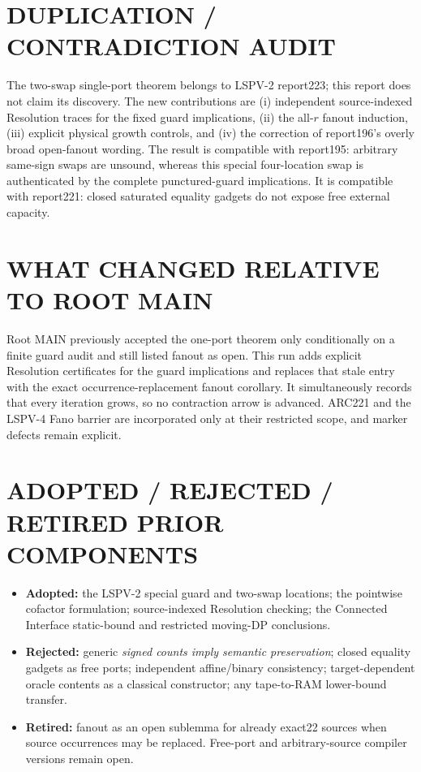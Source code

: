 \documentclass[11pt]{article}
\begin{document}
\section{DUPLICATION / CONTRADICTION AUDIT}
The two-swap single-port theorem belongs to LSPV-2 report223; this report does
not claim its discovery.  The new contributions are (i) independent
source-indexed Resolution traces for the fixed guard implications,
(ii) the all-\(r\) fanout induction, (iii) explicit physical growth controls,
and (iv) the correction of report196's overly broad open-fanout wording.
The result is compatible with report195: arbitrary same-sign swaps are
unsound, whereas this special four-location swap is authenticated by the
complete punctured-guard implications.  It is compatible with report221:
closed saturated equality gadgets do not expose free external capacity.

\section{WHAT CHANGED RELATIVE TO ROOT MAIN}
Root MAIN previously accepted the one-port theorem only conditionally on a
finite guard audit and still listed fanout as open.  This run adds explicit
Resolution certificates for the guard implications and replaces that stale
entry with the exact occurrence-replacement fanout corollary.  It simultaneously
records that every iteration grows, so no contraction arrow is advanced.
ARC221 and the LSPV-4 Fano barrier are incorporated only at their restricted
scope, and marker defects remain explicit.

\section{ADOPTED / REJECTED / RETIRED PRIOR COMPONENTS}
\begin{itemize}
\item \textbf{Adopted:} the LSPV-2 special guard and two-swap locations;
the pointwise cofactor formulation; source-indexed Resolution checking; the
Connected Interface static-bound and restricted moving-DP conclusions.
\item \textbf{Rejected:} generic \emph{signed counts imply semantic
preservation}; closed equality gadgets as free ports; independent
affine/binary consistency; target-dependent oracle contents as a classical
constructor; any tape-to-RAM lower-bound transfer.
\item \textbf{Retired:} fanout as an open sublemma for already exact22 sources
when source occurrences may be replaced.  Free-port and arbitrary-source
compiler versions remain open.
\end{itemize}
\end{document}
